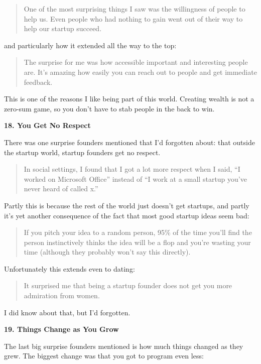 \begin{quote}
One of the most surprising things I saw was the willingness of people to
help us. Even people who had nothing to gain went out of their way to
help our startup succeed.
\end{quote}

and particularly how it extended all the way to the top:

\begin{quote}
The surprise for me was how accessible important and interesting people
are. It's amazing how easily you can reach out to people and get
immediate feedback.
\end{quote}

This is one of the reasons I like being part of this world. Creating
wealth is not a zero-sum game, so you don't have to stab people in the
back to win.

\textbf{18. You Get No Respect}

There was one surprise founders mentioned that I'd forgotten about: that
outside the startup world, startup founders get no respect.

\begin{quote}
In social settings, I found that I got a lot more respect when I said,
``I worked on Microsoft Office'' instead of ``I work at a small startup
you've never heard of called x.''
\end{quote}

Partly this is because the rest of the world just doesn't get startups,
and partly it's yet another consequence of the fact that most good
startup ideas seem bad:

\begin{quote}
If you pitch your idea to a random person, 95\% of the time you'll find
the person instinctively thinks the idea will be a flop and you're
wasting your time (although they probably won't say this directly).
\end{quote}

Unfortunately this extends even to dating:

\begin{quote}
It surprised me that being a startup founder does not get you more
admiration from women.
\end{quote}

I did know about that, but I'd forgotten.

\textbf{19. Things Change as You Grow}

The last big surprise founders mentioned is how much things changed as
they grew. The biggest change was that you got to program even less:

